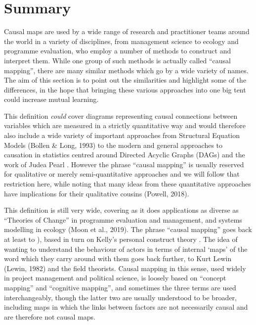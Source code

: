 \documentclass[
]{book}
\begin{document}
\hypertarget{summary-5}{%
\section{Summary}\label{summary-5}}

Causal maps are used by a wide range of research and practitioner teams around the world in a variety of disciplines, from management science to ecology and programme evaluation, who employ a number of methods to construct and interpret them. While one group of such methods is actually called ``causal mapping'', there are many similar methods which go by a wide variety of names. The aim of this section is to point out the similarities and highlight some of the differences, in the hope that bringing these various approaches into one big tent could increase mutual learning.

This definition \emph{could} cover diagrams representing causal connections between variables which are measured in a strictly quantitative way and would therefore also include a wide variety of important approaches from Structural Equation Models (Bollen \& Long, 1993) to the modern and general approaches to causation in statistics centred around Directed Acyclic Graphs (DAGs) and the work of Judea Pearl \citep{pearl2018}. However the phrase ``causal mapping'' is usually reserved for qualitative or merely semi-quantitative approaches and we will follow that restriction here, while noting that many ideas from these quantitative approaches have implications for their qualitative cousins (Powell, 2018).

This definition is still very wide, covering as it does applications as diverse as ``Theories of Change'' in programme evaluation and management, and systems modelling in ecology (Moon et al., 2019). The phrase ``causal mapping'' goes back at least to \citep{axelrod2015}), based in turn on Kelly's personal construct theory \citep{kellyPersonalConstructTheory1955}. The idea of wanting to understand the behaviour of actors in terms of internal `maps' of the word which they carry around with them goes back further, to Kurt Lewin (Lewin, 1982) and the field theorists. Causal mapping in this sense, used widely in project management and political science, is loosely based on ``concept mapping'' and ``cognitive mapping'', and sometimes the three terms are used interchangeably, though the latter two are usually understood to be broader, including maps in which the links between factors are not necessarily causal and are therefore not causal maps.
\end{document}
